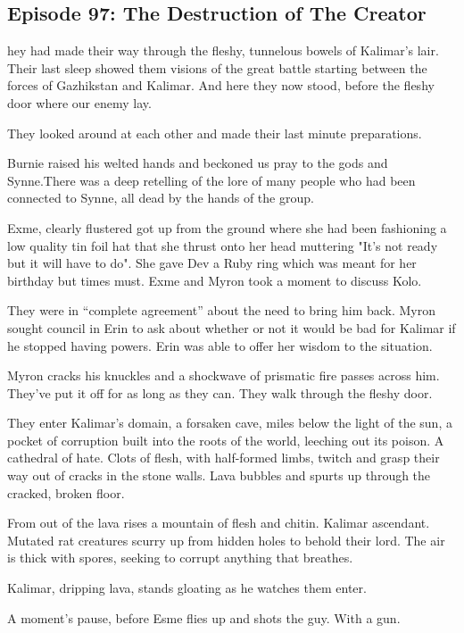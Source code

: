 \subsection{Episode 97: The Destruction of The Creator}

hey had made their way through the fleshy, tunnelous bowels of Kalimar's lair. Their last sleep showed them visions of the great battle starting between the forces of Gazhikstan and Kalimar. And here they now stood, before the fleshy door where our enemy lay.\medskip

They looked around at each other and made their last minute preparations.\medskip

Burnie raised his welted hands and beckoned us pray to the gods and Synne.There was a deep retelling of the lore of many people who had been connected to Synne, all dead by the hands of the group.\medskip

Exme, clearly flustered got up from the ground where she had been fashioning a low quality tin foil hat that she thrust onto her head muttering "It's not ready but it will have to do". She gave Dev a Ruby ring which was meant for her birthday but times must. Exme and Myron took a moment to discuss Kolo.\medskip

They were in “complete agreement” about the need to bring him back. Myron sought council in Erin to ask about whether or not it would be bad for Kalimar if he stopped having powers. Erin was able to offer her wisdom to the situation.\medskip

Myron cracks his knuckles and a shockwave of prismatic fire passes across him. They’ve put it off for as long as they can. They walk through the fleshy door.\medskip

They enter Kalimar’s domain, a forsaken cave, miles below the light of the sun, a pocket of corruption built into the roots of the world, leeching out its poison. A cathedral of hate. Clots of flesh, with half-formed limbs, twitch and grasp their way out of cracks in the stone walls. Lava bubbles and spurts up through the cracked, broken floor.\medskip

From out of the lava rises a mountain of flesh and chitin. Kalimar ascendant. Mutated rat creatures scurry up from hidden holes to behold their lord. The air is thick with spores, seeking to corrupt anything that breathes.\medskip

Kalimar, dripping lava, stands gloating as he watches them enter.\medskip

A moment’s pause, before Esme flies up and shots the guy. With a gun.\medskip

